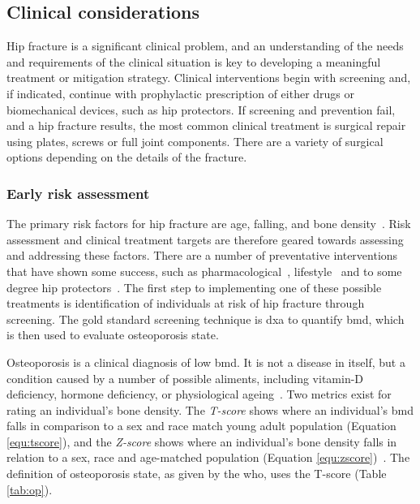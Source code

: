 \subsection{Clinical considerations}
\label{sec:fractures_clinic}
Hip fracture is a significant clinical problem, and an understanding of the needs and requirements of the clinical situation is key to developing a meaningful treatment or mitigation strategy.
Clinical interventions begin with screening and, if indicated, continue with prophylactic prescription of either drugs or biomechanical devices, such as hip protectors.
If screening and prevention fail, and a hip fracture results, the most common clinical treatment is surgical repair using plates, screws or full joint components.
There are a variety of surgical options depending on the details of the fracture.

\subsubsection{Early risk assessment}
\label{sec:fractures_clinic_risk}
The primary risk factors for hip fracture are age, falling, and bone density~\citep{cummings_risk_1995}.
Risk assessment and clinical treatment targets are therefore geared towards assessing and addressing these factors.
There are a number of preventative interventions that have shown some success, such as pharmacological~\citep{hodsman_bisphosphonates_2002}, lifestyle~\citep{moayyeri_association_2008} and to some degree hip protectors~\citep{haines_hip_2006}.
The first step to implementing one of these possible treatments is identification of individuals at risk of hip fracture through screening.
The gold standard screening technique is \acf{dxa} to quantify \acf{bmd}, which is then used to evaluate osteoporosis state.

Osteoporosis is a clinical diagnosis of low \ac{bmd}.
It is not a disease in itself, but a condition caused by a number of possible aliments, including vitamin-D deficiency, hormone deficiency, or physiological ageing~\citep[Ch.12]{avioli_metabolic_1998}.
Two metrics exist for rating an individual's bone density.
The \textit{T-score} shows where an individual's \ac{bmd} falls in comparison to a sex and race match young adult population (Equation \ref{equ:tscore}), and the \textit{Z-score} shows where an individual's bone density falls in relation to a sex, race and age-matched population (Equation \ref{equ:zscore})~\citep{orwoll_osteoporosis_2011}.
The definition of osteoporosis state, as given by the \ac{who}, uses the T-score (Table \ref{tab:op}).

